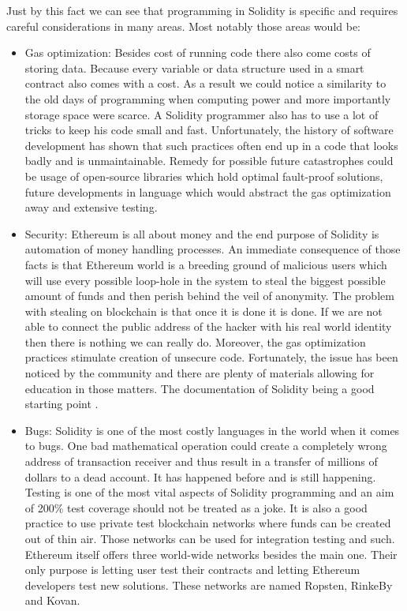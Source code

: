\documentclass[a4paper,12pt,twoside,openany]{report}
\begin{document}
Just by this fact we can see that programming in Solidity is specific and requires careful considerations in many areas. Most notably those areas would be:
\begin{itemize}
\item Gas optimization: Besides cost of running code there also come costs of storing data. Because every variable or data structure used in a smart contract also comes with a cost. As a result we could notice a similarity to the old days of programming when computing power and more importantly storage space were scarce. A Solidity programmer also has to use a lot of tricks to keep his code small and fast. Unfortunately, the history of software development has shown that such practices often end up in a code that looks badly and is unmaintainable. Remedy for possible future catastrophes could be usage of open-source libraries which hold optimal fault-proof solutions, future developments in language which would abstract the gas optimization away and extensive testing.
\item Security: Ethereum is all about money and the end purpose of Solidity is automation of money handling processes. An immediate consequence of those facts is that Ethereum world is a breeding ground of malicious users which will use every possible loop-hole in the system to steal the biggest possible amount of funds and then perish behind the veil of anonymity. The problem with stealing on blockchain is that once it is done it is done. If we are not able to connect the public address of the hacker with his real world identity then there is nothing we can really do. Moreover, the gas optimization practices stimulate creation of unsecure code. Fortunately, the issue has been noticed by the community and there are plenty of materials allowing for education in those matters. The documentation of Solidity being a good starting point \cite{secure}. 
\item Bugs: Solidity is one of the most costly languages in the world when it comes to bugs. One bad mathematical operation could create a completely wrong address of transaction receiver and thus result in a transfer of millions of dollars to a dead account. It has happened before and is still happening. Testing is one of the most vital aspects of Solidity programming and an aim of 200\% test coverage should not be treated as a joke. It is also a good practice to use private test blockchain networks where funds can be created out of thin air. Those networks can be used for integration testing and such. Ethereum itself offers three world-wide networks besides the main one. Their only purpose is letting user test their contracts and letting Ethereum developers test new solutions. These networks are named Ropsten, RinkeBy and Kovan. 
\end{itemize}
\end{document}
